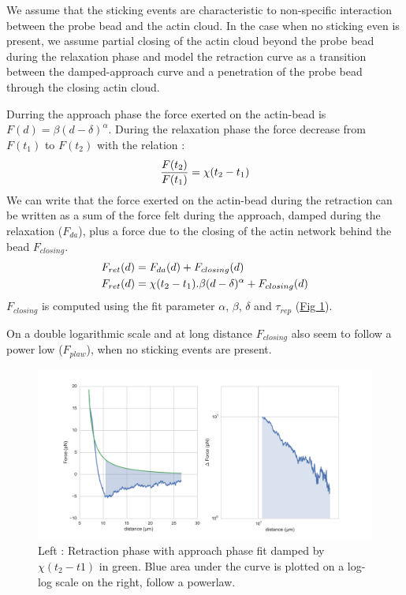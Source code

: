 \documentclass[A4paperpaper,11pt,english]{sphinxmanual}
\begin{document}
We assume that the sticking events are characteristic to non-specific interaction
between the probe bead and the actin cloud.  In the case when no sticking even
is present, we assume partial closing of the actin cloud beyond the
probe bead during the relaxation phase and model the retraction curve as a
transition between the damped-approach curve and a penetration of the probe
bead through the closing actin cloud.

Durring the approach phase the force exerted on the actin-bead is
\(F(d)=\beta(d-\delta)^\alpha\). During the relaxation phase the force
decrease from \(F(t_1)\) to \(F(t_2)\) with the relation :
\begin{gather}
\begin{split}\frac{F(t_2)}{F(t_1)} = \chi(t_2-t_1)\end{split}\notag
\end{gather}
We can write that the force exerted on the actin-bead during the retraction can
be written as a sum of the force felt during the approach, damped during the
relaxation (\(F_{da}\)), plus a force due to the closing of the actin
network behind the bead \(F_{closing}\).
\begin{gather}
\begin{split}F_{ret}(d) &= F_{da}(d) + F_{closing}(d)\\
F_{ret}(d) &= \chi(t_2-t_1).\beta(d-\delta)^\alpha+ F_{closing}(d)\end{split}\notag
\end{gather}
\(F_{closing}\) is computed using the fit parameter \(\alpha\), \(\beta\), \(\delta\) and \(\tau_{rep}\) (\hyperref[parts/part3:retract-powerlaw]{Fig  \ref*{parts/part3:retract-powerlaw}}).

On a double logarithmic scale and at long distance \(F_{closing}\) also seem to
follow a power low (\(F_{plaw}\)), when no sticking events are present.
\begin{figure}[htbp]
\centering
\capstart

\includegraphics[width=1.000\linewidth]{retract-powerlaw.png}
\caption{Left : Retraction phase with approach phase fit damped by
\(\chi(t_2-t1)\) in green. Blue area under the curve is plotted on a
log-log scale on the right, follow a powerlaw.}\label{parts/part3:retract-powerlaw}\end{figure}
\end{document}
